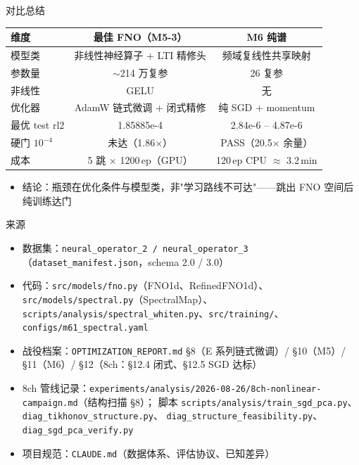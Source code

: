 \documentclass[aspectratio=169]{beamer}
\newcommand{\pos}[1]{\textcolor{blue!70!black}{#1}}
\newcommand{\con}[1]{\textcolor{orange!85!black}{#1}}
\newcommand{\HL}[1]{\textcolor{green!45!black}{#1}}
\begin{document}
\begin{frame}{对比总结}
  \begin{table}
    \centering
    \small
    \begin{tabular}{lcc}
      \toprule
      维度 & 最佳 FNO（M5-3） & M6 纯谱 \\
      \midrule
      模型类 & 非线性神经算子 + LTI 精修头 & 频域复线性共享映射 \\
      参数量 & $\sim$214 万复参 & \pos{26 复参} \\
      非线性 & GELU & 无 \\
      优化器 & AdamW 链式微调 + 闭式精修 & \pos{纯 SGD + momentum} \\
      最优 test rl2 & 1.85885e-4 & \HL{2.84e-6 -- 4.87e-6} \\
      硬门 $10^{-4}$ & \con{未达（1.86$\times$）} & \HL{PASS（20.5$\times$ 余量）} \\
      成本 & 5 跳 $\times$ 1200\,ep（GPU） & \pos{120\,ep CPU $\approx$ 3.2\,min} \\
      \bottomrule
    \end{tabular}
  \end{table}
  \begin{itemize}
    \item 结论：瓶颈在优化条件与模型类，非"学习路线不可达"——\HL{跳出 FNO 空间后纯训练达门}
  \end{itemize}
\end{frame}

\begin{frame}{来源}
  \begin{itemize}
    \item 数据集：\texttt{neural\_operator\_2 / neural\_operator\_3}（\texttt{dataset\_manifest.json}，schema 2.0 / 3.0）
    \item 代码：\texttt{src/models/fno.py}（FNO1d、RefinedFNO1d）、\texttt{src/models/spectral.py}（SpectralMap）、\texttt{scripts/analysis/spectral\_whiten.py}、\texttt{src/training/}、\texttt{configs/m61\_spectral.yaml}
    \item 战役档案：\texttt{OPTIMIZATION\_REPORT.md} §8（E 系列链式微调）/ §10（M5）/ §11（M6）/ §12（8ch：§12.4 闭式、§12.5 SGD 达标）
    \item 8ch 管线记录：\texttt{experiments/analysis/2026-08-26/8ch-nonlinear-campaign.md}（结构扫描 §8）；
      脚本 \texttt{scripts/analysis/train\_sgd\_pca.py}、\texttt{diag\_tikhonov\_structure.py}、
      \texttt{diag\_structure\_feasibility.py}、\texttt{diag\_sgd\_pca\_verify.py}
    \item 项目规范：\texttt{CLAUDE.md}（数据体系、评估协议、已知差异）
  \end{itemize}
\end{frame}
\end{document}
